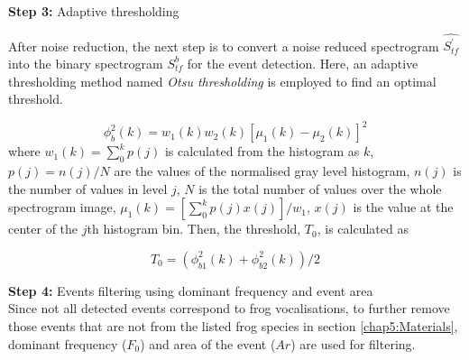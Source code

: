 \noindent \textbf{Step 3:} Adaptive thresholding

\noindent After noise reduction, the next step is to convert a noise reduced spectrogram $\hat{S^{'}_{tf}}$ into the binary spectrogram $S^{b}_{tf}$ for the event detection. Here, an adaptive thresholding method named \textit{Otsu thresholding} \cite{otsu1975threshold} is employed to find an optimal threshold.

\begin{equation}
\phi_{b}^{2}(k)=w_{1}(k)w_{2}(k)[\mu_{1}(k)-\mu_{2}(k)]^{2}
\end{equation}
\noindent where $w_{1}(k)=\sum_{0}^{k}p(j)$ is calculated from the histogram as $k$, $p(j)=n(j)/N$ are the values of the normalised gray level histogram, $n(j)$ is the number of values in level $j$, $N$ is the total number of values over the whole spectrogram image, $\mu_{1}(k)=[\sum_{0}^{k}p(j)x(j)]/w_{1}$, $x(j)$ is the value at the center of the $j$th histogram bin. Then, the threshold, $T_{0}$, is calculated as

\begin{equation}
T_{0}= (\phi_{b1}^{2}(k) + \phi_{b2}^{2}(k)) / 2
\end{equation}

\noindent \textbf{Step 4:} Events filtering using dominant frequency and event area \\
Since not all detected events correspond to frog vocalisations, to further remove those events that are not from the listed frog species in section \ref{chap5:Materials}, dominant frequency ($F_{0}$) and area of the event ($Ar$) are used for filtering.


